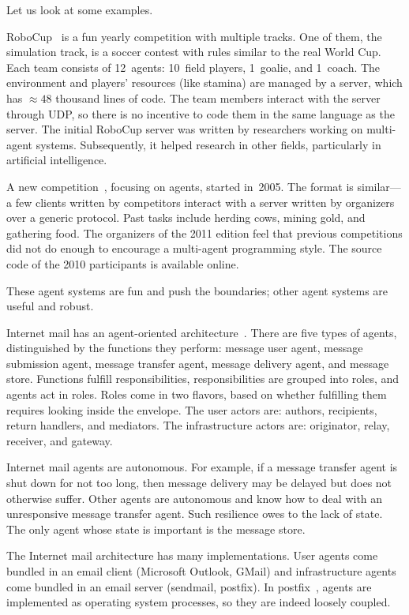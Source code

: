 \documentclass{article}
\begin{document}
Let us look at some examples.

RoboCup~\cite{journals/robotics/KitanoANM1998,site/robocup} is a fun yearly competition with multiple tracks.
One of them, the simulation track, is a soccer contest with rules similar to the real World Cup.
Each team consists of 12~agents: 10~field players, 1~goalie, and 1~coach.
The environment and players' resources (like stamina) are managed by a server, which has $\approx48$ thousand lines of code.
The team members interact with the server through UDP, so there is no incentive to code them in the same language as the server.
The initial RoboCup server was written by researchers working on multi-agent systems.
Subsequently, it helped research in other fields, particularly in artificial intelligence.

A new competition~\cite{site/mas_contest}, focusing on agents, started in~2005.
The format is similar---a few clients written by competitors interact with a server written by organizers over a generic protocol.
Past tasks include herding cows, mining gold, and gathering food.
The organizers of the 2011 edition feel that previous competitions did not do enough to encourage a multi-agent programming style.
The source code of the 2010 participants is available online.

These agent systems are fun and push the boundaries; 
other agent systems are useful and robust.

Internet mail has an agent-oriented architecture~\cite{rfc/5598}.
There are five types of agents, distinguished by the functions they perform: message user agent, message submission agent, message transfer agent, message delivery agent, and message store.
Functions fulfill responsibilities, responsibilities are grouped into roles, and agents act in roles.
Roles come in two flavors, based on whether fulfilling them requires looking inside the envelope.
The user actors are: authors, recipients, return handlers, and mediators.
The infrastructure actors are: originator, relay, receiver, and gateway.

Internet mail agents are autonomous.
For example, if a message transfer agent is shut down for not too long, then message delivery may be delayed but does not otherwise suffer.
Other agents are autonomous and know how to deal with an unresponsive message transfer agent.
Such resilience owes to the lack of state.
The only agent whose state is important is the message store.

The Internet mail architecture has many implementations.
User agents come bundled in an email client (Microsoft Outlook, GMail) and infrastructure agents come bundled in an email server (sendmail, postfix).
In postfix~\cite{site/postfix}, agents are implemented as operating system processes, so they are indeed loosely coupled.
\end{document}

